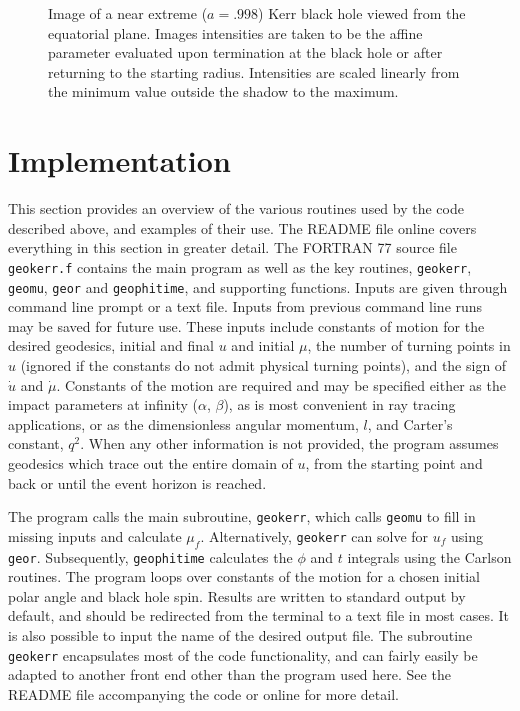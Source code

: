 \documentclass[apj]{emulateapj}
\begin{document}
\begin{figure}
\caption{\label{bhimage}Image of a near extreme ($a=.998$) Kerr black hole viewed from the equatorial plane. Images intensities are taken to be the affine parameter evaluated upon termination at the black hole or after returning to the starting radius. Intensities are scaled linearly from the minimum value outside the shadow to the maximum.}
\end{figure}

\section{Implementation}
\label{implementation}
This section provides an overview of the various routines used by the code described above, and examples of their use. The README file online covers everything in this section in greater detail. The FORTRAN 77 source file \texttt{geokerr.f} contains the main program as well as the key routines, \texttt{geokerr}, \texttt{geomu}, \texttt{geor} and \texttt{geophitime}, and supporting functions. Inputs are given through command line prompt or a text file. Inputs from previous command line runs may be saved for future use. These inputs include constants of motion for the desired geodesics, initial and final $u$ and initial $\mu$, the number of turning points in $u$ (ignored if the constants do not admit physical turning points), and the sign of $\dot{u}$ and $\dot{\mu}$. Constants of the motion are required and may be specified either as the impact parameters at infinity ($\alpha$, $\beta$), as is most convenient in ray tracing applications, or as the dimensionless angular momentum, $l$, and Carter's constant, $q^2$. When any other information is not provided, the program assumes geodesics which trace out the entire domain of $u$, from the starting point and back or until the event horizon is reached.

The program calls the main subroutine, \texttt{geokerr}, which calls \texttt{geomu} to fill in missing inputs and calculate $\mu_f$. Alternatively, \texttt{geokerr} can solve for $u_f$ using \texttt{geor}. Subsequently, \texttt{geophitime} calculates the $\phi$ and $t$ integrals using the Carlson routines. The program loops over constants of the motion for a chosen initial polar angle and black hole spin. Results are written to standard output by default, and should be redirected from the terminal to a text file in most cases. It is also possible to input the name of the desired output file. The subroutine \texttt{geokerr} encapsulates most of the code functionality, and can fairly easily be adapted to another front end other than the program used here. See the README file accompanying the code or online for more detail.
\end{document}

